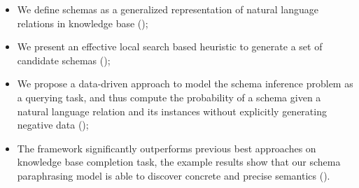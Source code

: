 \begin{itemize}
\itemsep0em
\item We define schemas as a generalized representation of natural language
relations in knowledge base ();
\item %
We present an effective local search based heuristic to generate a set of
candidate schemas ();
\item We propose a data-driven approach to model the schema inference
problem as a querying task, and thus compute the probability of a schema
given a natural language relation and its instances
without explicitly generating negative data ();
\item The framework significantly outperforms 
previous best approaches on knowledge base completion task,
the example results show that our schema paraphrasing model
is able to discover concrete and precise semantics ().
\end{itemize}
